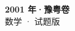 \documentclass[zihao=-4, a4paper]{ctexart}
\begin{document}
\begin{center}
  {\Large\bfseries 2001 年·豫粤卷}\\[4pt]
  {\large 数学 · 试题版}
\end{center}
\medskip
{}

\end{document}
